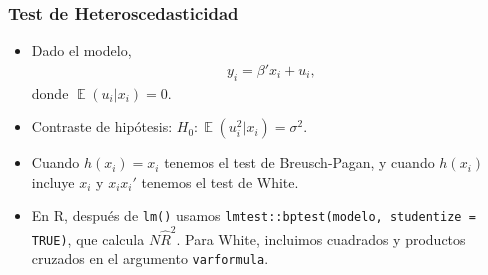 \documentclass[t, compress, spanish, aspectratio=169]{beamer}
\DeclareMathOperator{\E}{\mathbb{E}}
\begin{document}
\begin{frame}[fragile]
    \frametitle{Test de Heteroscedasticidad}
    \begin{itemize}
        \item  Dado el modelo,
        \begin{align*}
            y_i=\beta'x_i+u_i,
        \end{align*}
        donde $\E(u_i|x_i)=0$.
        \item  Contraste de  hip\'otesis: $H_0:\E(u_i^2|x_i)=\sigma^2$.
        \item Cuando $h(x_i)=x_i$ tenemos el test de Breusch-Pagan, y cuando $h(x_i)$ incluye $x_i$ y $x_ix_i'$ tenemos el test de White.
        \item  En R, despu\'es de \verb|lm()| usamos \verb|lmtest::bptest(modelo, studentize = TRUE)|, que calcula $N\hat R^2$. Para White, incluimos cuadrados y productos cruzados en el argumento \verb|varformula|.
    \end{itemize}
\end{frame}
\end{document}
